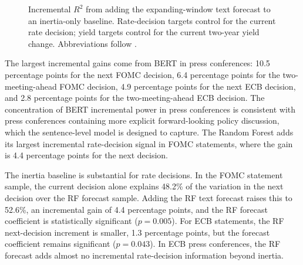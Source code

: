 \begin{figure}[H]
  \centering
  \caption[Incremental $R^2$ of text forecasts beyond inertia]{Incremental
    $R^2$ from adding the expanding-window text forecast to an inertia-only
    baseline. Rate-decision targets control for the current rate decision;
    yield targets control for the current two-year yield change. Abbreviations
    follow .}
  \label{fig:rq2_incremental_r2_v31}
\end{figure}

The largest incremental gains come from BERT in press conferences: 10.5
percentage points for the next FOMC decision, 6.4 percentage points for the
two-meeting-ahead FOMC decision, 4.9 percentage points for the next ECB
decision, and 2.8 percentage points for the two-meeting-ahead ECB decision.
The concentration of BERT incremental power in press conferences is consistent
with press conferences containing more explicit forward-looking policy
discussion, which the sentence-level model is designed to capture. The Random
Forest adds its largest incremental rate-decision signal in FOMC statements,
where the gain is 4.4 percentage points for the next decision.

The inertia baseline is substantial for rate decisions. In the FOMC statement
sample, the current decision alone explains 48.2\% of the variation in the
next decision over the RF forecast sample. Adding the RF text forecast raises
this to 52.6\%, an incremental gain of 4.4 percentage points, and the RF
forecast coefficient is statistically significant ($p=0.005$). For ECB
statements, the RF next-decision increment is smaller, 1.3 percentage points,
but the forecast coefficient remains significant ($p=0.043$). In ECB press
conferences, the RF forecast adds almost no incremental rate-decision
information beyond inertia.


